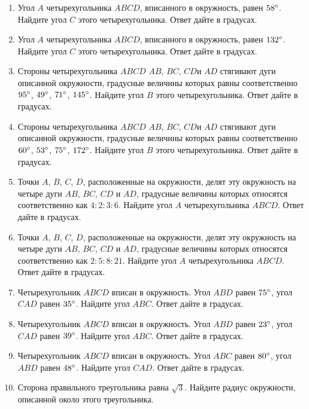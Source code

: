 \documentclass[12pt, a4paper]{article}
\begin{document}
\begin{enumerate}
		\item Угол \( A  \) четырехугольника \( ABCD \), вписанного в окружность, равен \( 58\degree\). Найдите угол \( C  \) этого четырехугольника. Ответ дайте в градусах.
		\item Угол \( A  \) четырехугольника \( ABCD \), вписанного в окружность, равен \( 132\degree  \). Найдите угол \( C  \) этого четырехугольника. Ответ дайте в градусах.
		\item Стороны четырехугольника \( ABCD  \) \( AB \), \( BC \), \( CD  \)и \( AD  \) стягивают дуги описанной окружности, градусные величины которых равны соответственно \( 95 \degree\), \( 49 \degree \), \( 71\degree \), \( 145 \degree\). Найдите угол \( B  \) этого четырехугольника. Ответ дайте в градусах.
		\item Стороны четырехугольника \( ABCD  \) \( AB \), \( BC \), \( CD  \)и \( AD  \) стягивают дуги описанной окружности, градусные величины которых равны соответственно \( 60  \degree\), \( 53  \degree\), \( 75  \degree\), \( 172  \degree\). Найдите угол \( B  \) этого четырехугольника. Ответ дайте в градусах.
		\item Точки \( A \), \( B \), \( C \), \( D \), расположенные на окружности, делят эту окружность на четыре дуги \( AB \), \( BC \), \( CD  \) и \( AD \), градусные величины которых относятся соответственно как \( 4:2:3:6 \). Найдите угол \( A  \) четырехугольника \( ABCD \). Ответ дайте в градусах.
		\item Точки \( A \), \( B \), \( C \), \( D \), расположенные на окружности, делят эту окружность на четыре дуги \( AB \), \( BC \), \( CD  \) и \( AD \), градусные величины которых относятся соответственно как \( 2:5:8:21 \). Найдите угол \( A  \) четырехугольника \( ABCD \). Ответ дайте в градусах.
		\item Четырехугольник \( ABCD  \) вписан в окружность. Угол \( ABD  \) равен \( 75\degree \), угол \( CAD  \) равен \( 35\degree\). Найдите угол \( ABC \). Ответ дайте в градусах.
		\item Четырехугольник \( ABCD  \) вписан в окружность. Угол \( ABD  \) равен \( 23  \degree\), угол \( CAD  \) равен \( 39  \degree\). Найдите угол \( ABC \). Ответ дайте в градусах.
		\item Четырехугольник \( ABCD  \) вписан в окружность. Угол \( ABC  \) равен \( 80  \degree\), угол \( ABD  \) равен \( 48  \degree\). Найдите угол \( CAD \). Ответ дайте в градусах. 
		\item Сторона правильного треугольника равна \( \sqrt{3} \). Найдите радиус окружности, описанной около этого треугольника.

\end{enumerate}
\end{document}
